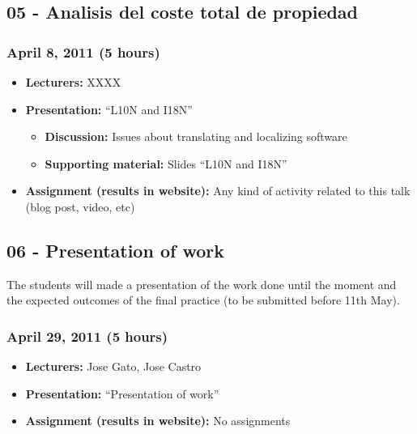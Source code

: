 \documentclass[a4paper]{article}
\begin{document}
\subsection{05 - Analisis del coste total de propiedad}


\subsubsection{April 8, 2011 (5 hours)}

\begin{itemize}
\item \textbf{Lecturers:} XXXX
\item \textbf{Presentation:} ``L10N and I18N''
  \begin{itemize}
  \item \textbf{Discussion:} Issues about translating and localizing software
  \item \textbf{Supporting material:} Slides ``L10N and I18N''
  \end{itemize}
\item \textbf{Assignment (results in website):} Any kind of activity
  related to this talk (blog post, video, etc)
\end{itemize}


\subsection{06 - Presentation of work}

The students will made a presentation of the work done until the moment and the expected outcomes of the final practice (to be submitted before 11th May).

\subsubsection{April 29, 2011 (5 hours)}

\begin{itemize}
\item \textbf{Lecturers:} Jose Gato, Jose Castro
\item \textbf{Presentation:} ``Presentation of work''
\item \textbf{Assignment (results in website):} No assignments
\end{itemize}
\end{document}
